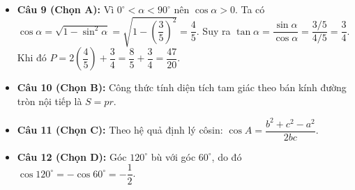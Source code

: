 \documentclass[12pt,a4paper]{article}
\begin{document}
\begin{itemize}[leftmargin=0.6cm, itemsep=3pt]
\item \textbf{Câu 9 (Chọn A):} Vì $0^\circ < \alpha < 90^\circ$ nên $\cos\alpha > 0$. Ta có $\cos\alpha = \sqrt{1 - \sin^2\alpha} = \sqrt{1 - \left(\dfrac{3}{5}\right)^2} = \dfrac{4}{5}$. Suy ra $\tan\alpha = \dfrac{\sin\alpha}{\cos\alpha} = \dfrac{3/5}{4/5} = \dfrac{3}{4}$. Khi đó $P = 2\left(\dfrac{4}{5}\right) + \dfrac{3}{4} = \dfrac{8}{5} + \dfrac{3}{4} = \dfrac{47}{20}$.
\item \textbf{Câu 10 (Chọn B):} Công thức tính diện tích tam giác theo bán kính đường tròn nội tiếp là $S = pr$.
\item \textbf{Câu 11 (Chọn C):} Theo hệ quả định lý côsin: $\cos A = \dfrac{b^2 + c^2 - a^2}{2bc}$.
\item \textbf{Câu 12 (Chọn D):} Góc $120^\circ$ bù với góc $60^\circ$, do đó $\cos 120^\circ = -\cos 60^\circ = -\dfrac{1}{2}$.
\end{itemize}
\end{document}
